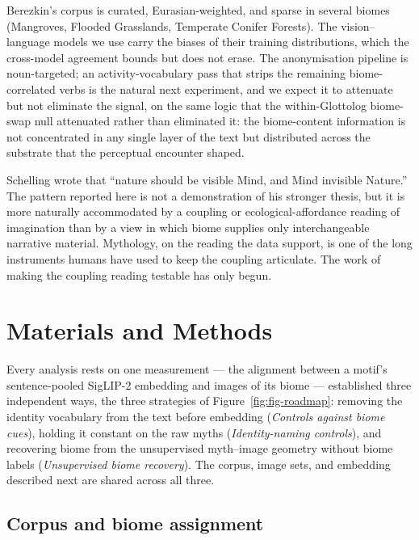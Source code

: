 \documentclass[11pt,a4paper]{article}
\begin{document}
Berezkin's corpus is curated, Eurasian-weighted, and sparse in
several biomes (Mangroves, Flooded Grasslands, Temperate Conifer
Forests). The vision--language models we use carry the biases of
their training distributions, which the cross-model agreement
bounds but does not erase. The anonymisation pipeline is
noun-targeted; an activity-vocabulary pass that strips the
remaining biome-correlated verbs is the natural next experiment,
and we expect it to attenuate but not eliminate the signal, on
the same logic that the within-Glottolog biome-swap null
attenuated rather than eliminated it: the biome-content
information is not concentrated in any single layer of the text
but distributed across the substrate that the perceptual
encounter shaped.

Schelling wrote that ``nature should be visible Mind, and Mind
invisible Nature.'' The pattern reported here is not a
demonstration of his stronger thesis, but it is more naturally
accommodated by a coupling or ecological-affordance reading of
imagination than by a view in which biome supplies only
interchangeable narrative material. Mythology, on the reading
the data support, is one of the long instruments humans have
used to keep the coupling articulate. The work of making the
coupling reading testable has only begun.

\section*{Materials and Methods}

Every analysis rests on one measurement --- the alignment between a
motif's sentence-pooled SigLIP-2 embedding and images of its biome ---
established three independent ways, the three strategies of
Figure~\ref{fig:fig-roadmap}: removing the identity vocabulary from the
text before embedding (\emph{Controls against biome cues}), holding it
constant on the raw myths (\emph{Identity-naming controls}), and
recovering biome from the unsupervised myth--image geometry without
biome labels (\emph{Unsupervised biome recovery}). The corpus, image
sets, and embedding described next are shared across all three.

\subsection*{Corpus and biome assignment}
\end{document}
